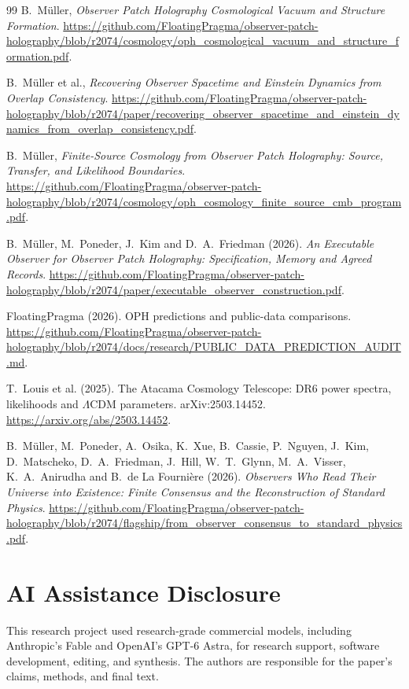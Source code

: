 \documentclass[11pt]{article}
\theoremstyle{remark}
\theoremstyle{plain}
\begin{document}
\begin{thebibliography}{99}
B.~M\"uller, \emph{Observer Patch Holography Cosmological Vacuum and Structure Formation}.
\url{https://github.com/FloatingPragma/observer-patch-holography/blob/r2074/cosmology/oph_cosmological_vacuum_and_structure_formation.pdf}.

B.~M\"uller et al.,
\emph{Recovering Observer Spacetime and Einstein Dynamics from Overlap Consistency}.
\url{https://github.com/FloatingPragma/observer-patch-holography/blob/r2074/paper/recovering_observer_spacetime_and_einstein_dynamics_from_overlap_consistency.pdf}.

B.~M\"uller, \emph{Finite-Source Cosmology from Observer Patch Holography:
Source, Transfer, and Likelihood Boundaries}.
\url{https://github.com/FloatingPragma/observer-patch-holography/blob/r2074/cosmology/oph_cosmology_finite_source_cmb_program.pdf}.

B.~M\"uller, M.~Poneder, J.~Kim and D.~A.~Friedman (2026). \emph{An Executable
Observer for Observer Patch Holography: Specification, Memory and Agreed
Records}.
\url{https://github.com/FloatingPragma/observer-patch-holography/blob/r2074/paper/executable_observer_construction.pdf}.

FloatingPragma (2026). OPH predictions and public-data comparisons.
\url{https://github.com/FloatingPragma/observer-patch-holography/blob/r2074/docs/research/PUBLIC_DATA_PREDICTION_AUDIT.md}.

T.~Louis et al. (2025). The Atacama Cosmology Telescope: DR6 power spectra,
likelihoods and \(\Lambda\)CDM parameters. arXiv:2503.14452.
\url{https://arxiv.org/abs/2503.14452}.

B.~M\"uller, M.~Poneder, A.~Osika, K.~Xue, B.~Cassie, P.~Nguyen, J.~Kim,
D.~Matscheko, D.~A.~Friedman, J.~Hill, W.~T.~Glynn, M.~A.~Visser,
K.~A.~Anirudha and B.~de La Fourni\`ere (2026). \emph{Observers Who Read Their
Universe into Existence: Finite Consensus and the Reconstruction of Standard
Physics}.
\url{https://github.com/FloatingPragma/observer-patch-holography/blob/r2074/flagship/from_observer_consensus_to_standard_physics.pdf}.

\end{thebibliography}

\section*{AI Assistance Disclosure}
This research project used research-grade commercial models, including
Anthropic's Fable and OpenAI's GPT-6 Astra, for research support, software
development, editing, and synthesis. The authors are responsible for the
paper's claims, methods, and final text.
\end{document}
